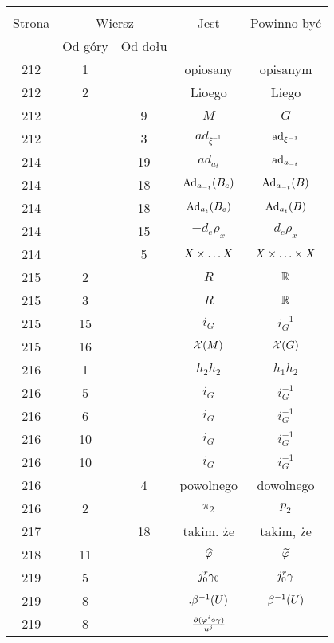 \documentclass[a4paper,11pt]{article}
\begin{document}
\begin{center}
  \begin{tabular}{|c|c|c|c|c|}
    \hline
    & \multicolumn{2}{c|}{} & & \\
    Strona & \multicolumn{2}{c|}{Wiersz} & Jest
                              & Powinno być \\ \cline{2-3}
    & Od góry & Od dołu & & \\
    \hline
    212 &  1 & & opiosany & opisanym \\
    212 &  2 & & Lioego & Liego \\
    212 & &  9 & $M$ & $G$ \\
    212 & &  3 & $ad_{ \xi^{ -1 } }$ & $\mathrm{ad}_{ \xi^{ -1 } }$ \\
    214 & & 19 & $ad_{ a_{ t } }$ & $\mathrm{ad}_{ a_{ -t } }$ \\
    214 & & 18 & $\mathrm{Ad}_{ a_{ -t } }( B_{ e } )$ & $\mathrm{Ad}_{ a_{ -t } }( B )$ \\
    214 & & 18 & $\mathrm{Ad}_{ a_{ t } }( B_{ e } )$ & $\mathrm{Ad}_{ a_{ t } }( B )$ \\
    214 & & 15 & $-d_{ e }\rho_{ x }$ & $d_{ e }\rho_{ x }$ \\
    214 & &  5 & $X \times \ldots X$ & $X \times \ldots \times X$ \\
    215 &  2 & & $R$ & $\mathbb{R}$ \\
    215 &  3 & & $R$ & $\mathbb{R}$ \\
    215 & 15 & & $i_{ G }$ & $i_{ G }^{ -1 }$ \\
    215 & 16 & & $\mathcal{X}( M )$ & $\mathcal{X}( G )$ \\
    216 &  1 & & $h_{ 2 }h_{ 2 }$ & $h_{ 1 }h_{ 2 }$ \\
    216 &  5 & & $i_{ G }$ & $i^{ -1 }_{ G }$ \\
    216 &  6 & & $i_{ G }$ & $i^{ -1 }_{ G }$ \\
    216 & 10 & & $i_{ G }$ & $i^{ -1 }_{ G }$ \\
    216 & 10 & & $i_{ G }$ & $i^{ -1 }_{ G }$ \\
    216 & &  4 & powolnego & dowolnego \\
    216 &  2 & & $\pi_{ 2 }$ & $p_{ 2 }$ \\
    217 & & 18 & takim. że & takim, że \\
    218 & 11 & & $\widehat{ \varphi }$ & $\widetilde{ \varphi }$ \\
    219 &  5 & & $j^{ r }_{ 0 } \gamma_{ 0 }$ & $j^{ r }_{ 0 } \gamma$ \\
    219 &  8 & & $.\beta^{ -1 }( U )$ & $\beta^{ -1 }( U )$ \\
    219 &  8 & & $\frac{ \partial ( \varphi^{ i } \circ \gamma ) }{ u^{ j } }$

\end{tabular}
\end{center}
\end{document}
